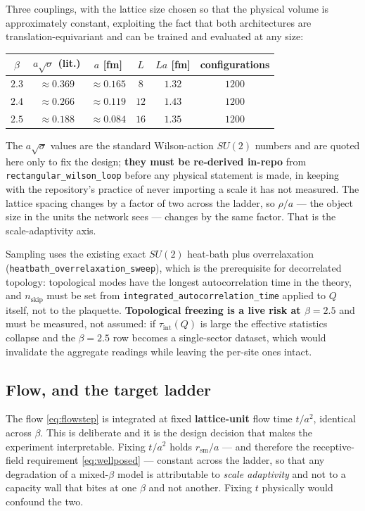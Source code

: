 \documentclass[11pt,a4paper]{article}
\begin{document}
Three couplings, with the lattice size chosen so that the physical volume is
approximately constant, exploiting the fact that both architectures are
translation-equivariant and can be trained and evaluated at any size:

\begin{center}
\begin{tabular}{cccccc}
\toprule
$\beta$ & $a\sqrt{\sigma}$ (lit.) & $a$ [fm] & $L$ & $La$ [fm] & configurations \\
\midrule
$2.3$ & $\approx 0.369$ & $\approx 0.165$ & $8$  & $1.32$ & $1200$ \\
$2.4$ & $\approx 0.266$ & $\approx 0.119$ & $12$ & $1.43$ & $1200$ \\
$2.5$ & $\approx 0.188$ & $\approx 0.084$ & $16$ & $1.35$ & $1200$ \\
\bottomrule
\end{tabular}
\end{center}

The $a\sqrt{\sigma}$ values are the standard Wilson-action $SU(2)$ numbers and
are quoted here only to fix the design; \textbf{they must be re-derived in-repo}
from \texttt{rectangular\_wilson\_loop} before any physical statement is made, in
keeping with the repository's practice of never importing a scale it has not
measured. The lattice spacing changes by a factor of two across the ladder, so
$\rho/a$ --- the object size in the units the network sees --- changes by the
same factor. That is the scale-adaptivity axis.

Sampling uses the existing exact $SU(2)$ heat-bath plus overrelaxation
(\texttt{heatbath\_overrelaxation\_sweep}), which is the prerequisite for
decorrelated topology: topological modes have the longest autocorrelation time in
the theory, and $n_{\mathrm{skip}}$ must be set from
\texttt{integrated\_autocorrelation\_time} applied to $Q$ itself, not to the
plaquette. \textbf{Topological freezing is a live risk at $\beta = 2.5$} and must
be measured, not assumed: if $\tau_{\mathrm{int}}(Q)$ is large the effective
statistics collapse and the $\beta = 2.5$ row becomes a single-sector dataset,
which would invalidate the aggregate readings while leaving the per-site ones
intact.

\subsection{Flow, and the target ladder}

The flow \eqref{eq:flowstep} is integrated at fixed \textbf{lattice-unit} flow
time $t/a^2$, identical across $\beta$. This is deliberate and it is the design
decision that makes the experiment interpretable. Fixing $t/a^2$ holds
$r_{\mathrm{sm}}/a$ --- and therefore the receptive-field requirement
\eqref{eq:wellposed} --- constant across the ladder, so that any degradation of a
mixed-$\beta$ model is attributable to \emph{scale adaptivity} and not to a
capacity wall that bites at one $\beta$ and not another. Fixing $t$ physically
would confound the two.
\end{document}
